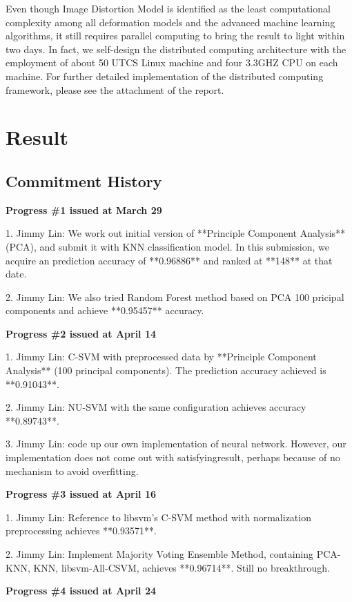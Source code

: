 \documentclass{article} %
\begin{document}
Even though Image Distortion Model is identified as the least computational
complexity among all deformation models and the advanced machine learning
algorithms, it still requires parallel computing to bring the result to light
within two days. In fact, we self-design the distributed computing
architecture with the employment of about 50 UTCS Linux machine and four
3.3GHZ CPU on each machine. For further detailed implementation of the
distributed computing framework, please see the attachment of the report.  


\section{Result} \label{Comparison}

\subsection{Commitment History}
{\bf Progress \#1 issued at March 29 }

1. Jimmy Lin: We work out initial version of **Principle Component Analysis**(PCA), and
submit it with KNN classification model. In this submission, we acquire an
prediction accuracy of **0.96886** and ranked at **148** at that date. 

2. Jimmy Lin: We also tried Random Forest method based on PCA 100 pricipal components and
achieve **0.95457** accuracy.

{\bf Progress \#2 issued at April 14 }

1. Jimmy Lin: C-SVM with preprocessed data by **Principle Component Analysis** (100
principal components). The prediction accuracy achieved is **0.91043**.

2. Jimmy Lin: NU-SVM with the same configuration achieves accuracy **0.89743**.

3. Jimmy Lin: code up our own implementation of neural network. However,
our implementation does not come out with satisfyingresult, perhaps because of
no mechanism to avoid overfitting.  

{\bf Progress \#3 issued at April 16 }

1. Jimmy Lin: Reference to libsvm's C-SVM method with normalization preprocessing achieves **0.93571**.

2. Jimmy Lin: Implement Majority Voting Ensemble Method, containing PCA-KNN, KNN, libsvm-All-CSVM,
achieves **0.96714**. Still no breakthrough.

{\bf Progress \#4 issued at April 24 }
\end{document}
